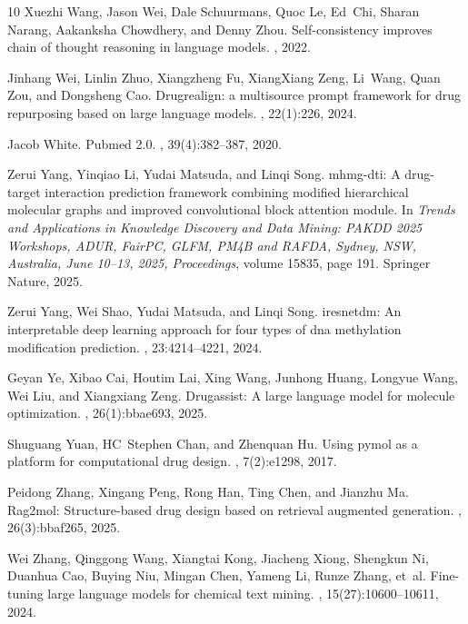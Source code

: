 \documentclass[letterpaper,twocolumn,10pt]{llncs}
\begin{document}
\begin{thebibliography}{10}
Xuezhi Wang, Jason Wei, Dale Schuurmans, Quoc Le, Ed~Chi, Sharan Narang, Aakanksha Chowdhery, and Denny Zhou.
\newblock Self-consistency improves chain of thought reasoning in language models.
, 2022.

Jinhang Wei, Linlin Zhuo, Xiangzheng Fu, XiangXiang Zeng, Li~Wang, Quan Zou, and Dongsheng Cao.
\newblock Drugrealign: a multisource prompt framework for drug repurposing based on large language models.
, 22(1):226, 2024.

Jacob White.
\newblock Pubmed 2.0.
, 39(4):382--387, 2020.

Zerui Yang, Yinqiao Li, Yudai Matsuda, and Linqi Song.
\newblock mhmg-dti: A drug-target interaction prediction framework combining modified hierarchical molecular graphs and improved convolutional block attention module.
\newblock In {\em Trends and Applications in Knowledge Discovery and Data Mining: PAKDD 2025 Workshops, ADUR, FairPC, GLFM, PM4B and RAFDA, Sydney, NSW, Australia, June 10--13, 2025, Proceedings}, volume 15835, page 191. Springer Nature, 2025.

Zerui Yang, Wei Shao, Yudai Matsuda, and Linqi Song.
\newblock iresnetdm: An interpretable deep learning approach for four types of dna methylation modification prediction.
, 23:4214--4221, 2024.

Geyan Ye, Xibao Cai, Houtim Lai, Xing Wang, Junhong Huang, Longyue Wang, Wei Liu, and Xiangxiang Zeng.
\newblock Drugassist: A large language model for molecule optimization.
, 26(1):bbae693, 2025.

Shuguang Yuan, HC~Stephen Chan, and Zhenquan Hu.
\newblock Using pymol as a platform for computational drug design.
, 7(2):e1298, 2017.

Peidong Zhang, Xingang Peng, Rong Han, Ting Chen, and Jianzhu Ma.
\newblock Rag2mol: Structure-based drug design based on retrieval augmented generation.
, 26(3):bbaf265, 2025.

Wei Zhang, Qinggong Wang, Xiangtai Kong, Jiacheng Xiong, Shengkun Ni, Duanhua Cao, Buying Niu, Mingan Chen, Yameng Li, Runze Zhang, et~al.
\newblock Fine-tuning large language models for chemical text mining.
, 15(27):10600--10611, 2024.


\end{thebibliography}
\end{document}
